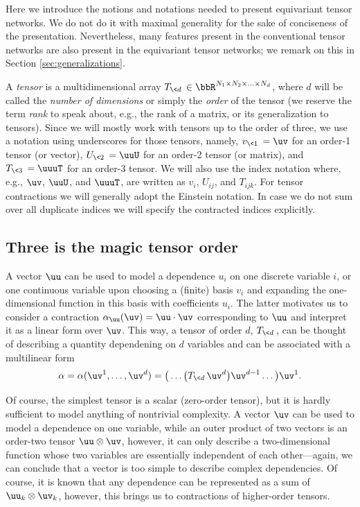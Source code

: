 Here we introduce the notions and notations needed to present equivariant tensor networks.
We do not do it with maximal generality for the sake of conciseness of the presentation.
Nevertheless, many features present in the conventional tensor networks are also present in the equivariant tensor networks; we remark on this in Section \ref{sec:generalizations}.

A \emph{tensor} is a multidimensional array $T_{\< d\>} \in\bbR^{N_1\times N_2\times \ldots\times N_d}$, where $d$ will be called the \emph{number of dimensions} or simply the \emph{order} of the tensor (we reserve the term \emph{rank} to speak about, e.g., the rank of a matrix, or its generalization to tensors).
Since we will mostly work with tensors up to the order of three, we use a notation using underscores for those tensors, namely, $v_{\< 1\>}  =\uv$ for an order-1 tensor (or vector), $U_{\< 2\>} = \uuU$ for an order-2 tensor (or matrix), and $T_{\<3\>} = \uuuT$ for an order-3 tensor.
We will also use the index notation where, e.g., $\uv$, $\uuU$, and $\uuuT$, are written as $v_i$, $U_{ij}$, and $T_{ijk}$.
For tensor contractions we will generally adopt the Einstein notation.
In case we do not sum over all duplicate indices we will specify the contracted indices explicitly.

\subsection{Three is the magic tensor order}

A vector $\uu$ can be used to model a dependence $u_i$ on one discrete variable $i$, or one continuous variable upon choosing a (finite) basis $v_i$ and expanding the one-dimensional function in this basis with coefficients $u_i$.
The latter motivates us to consider a contraction $\alpha_{\uu}(\uv) = \uu \cdot \uv$ corresponding to $\uu$ and interpret it as a linear form over $\uv$.
This way, a tensor of order $d$, $T_{\< d\>}$, can be thought of describing a quantity dependening on $d$ variables and can be associated with a multilinear form
\begin{equation}\label{eq:tensor-contraction}
    \alpha = \alpha(\uv^1, \ldots, \uv^d) = \big( \ldots \big( T_{\< d\>} \uv^d \big) \uv^{d-1} \ldots \big) \uv^1.
\end{equation}

Of course, the simplest tensor is a scalar (zero-order tensor), but it is hardly sufficient to model anything of nontrivial complexity. A vector $\uv$ can be used to model a dependence on one variable, while an outer product of two vectors is an order-two tensor $\uu\otimes \uv$, however, it can only describe a two-dimensional function whose two variables are essentially independent of each other---again, we can conclude that a vector is too simple to describe complex dependencies.
Of course, it is known that any dependence can be represented as a sum of $\uu_k\otimes \uv_k$, however, this brings us to contractions of higher-order tensors.

